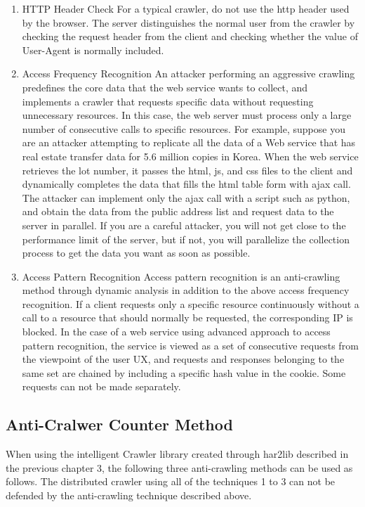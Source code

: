\documentclass[letterpaper, 10 pt, conference]{ieeeconf}
\begin{document}
\begin{enumerate}
\item HTTP Header Check
\newline For a typical crawler, do not use the http header used by the browser. The server distinguishes the normal user from the crawler by checking the request header from the client and checking whether the value of User-Agent is normally included.
\newline
\item Access Frequency Recognition
\newline 
An attacker performing an aggressive crawling predefines the core data that the web service wants to collect, and implements a crawler that requests specific data without requesting unnecessary resources. In this case, the web server must process only a large number of consecutive calls to specific resources. For example, suppose you are an attacker attempting to replicate all the data of a Web service that has real estate transfer data for 5.6 million copies in Korea. When the web service retrieves the lot number, it passes the html, js, and css files to the client and dynamically completes the data that fills the html table form with ajax call. The attacker can implement only the ajax call with a script such as python, and obtain the data from the public address list and request data to the server in parallel. If you are a careful attacker, you will not get close to the performance limit of the server, but if not, you will parallelize the collection process to get the data you want as soon as possible.
\newline
\item Access Pattern Recognition
\newline
Access pattern recognition is an anti-crawling method through dynamic analysis in addition to the above access frequency recognition. If a client requests only a specific resource continuously without a call to a resource that should normally be requested, the corresponding IP is blocked. In the case of a web service using advanced approach to access pattern recognition, the service is viewed as a set of consecutive requests from the viewpoint of the user UX, and requests and responses belonging to the same set are chained by including a specific hash value in the cookie. Some requests can not be made separately.
\end{enumerate}


\subsection{Anti-Cralwer Counter Method}
When using the intelligent Crawler library created through har2lib described in the previous chapter 3, the following three anti-crawling methods can be used as follows. The distributed crawler using all of the techniques 1 to 3 can not be defended by the anti-crawling technique described above.
\end{document}
